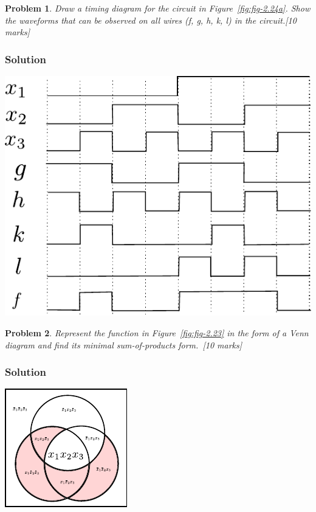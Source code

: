\documentclass[twocolumn]{article}
\newtheorem{prob}{Problem}
\begin{document}
\begin{prob}
Draw a timing diagram for the circuit in Figure~\ref{fig:fig-2.24a}. Show the
waveforms that can be observed on all wires (f, g, h, k, l) in the circuit.\cite[Prob 2.8]{brown2013fundamentals}[10 marks]
\end{prob}
\subsubsection*{Solution}
\includegraphics[width=\linewidth]{fig/timing-diagram.pdf}

\begin{prob}
Represent the function in Figure~\ref{fig:fig-2.23} in the form of a Venn diagram and find its minimal
sum-of-products form.~\cite[Prob 2.17]{brown2013fundamentals}[10 marks]
\end{prob}
\subsubsection*{Solution}
\includegraphics[width=\linewidth]{fig/venn-diagram.pdf}
\end{document}
